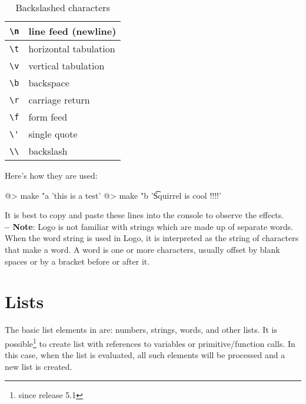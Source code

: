 \begin{table}[ht]
\begin{center}
\begin{tabular}{|c|l|}
\hline
\verb+\n+\index{\verb+\n+} & line feed (newline)\\
\hline
\verb+\t+\index{\verb+\t+} & horizontal tabulation\\
\hline
\verb+\v+\index{\verb+\v+} & vertical tabulation\\
\hline
\verb+\b+\index{\verb+\b+} & backspace\\
\hline
\verb+\r+\index{\verb+\r+} & carriage return\\
\hline
\verb+\f+\index{\verb+\f+} & form feed\\
\hline
\verb+\'+\index{\verb+\'+} & single quote\\
\hline
\verb+\\+\index{\verb+\\+} & backslash\\
\hline
\end{tabular}
\end{center}
\caption{Backslashed characters}
\end{table}
 
Here's how they are used:

\begin{verbatimtab}
@> make "a 'this is a test\n'
@> make "b '\t Squirrel is cool !!!!\n'
\end{verbatimtab}

It is best to copy and paste these lines into the console to observe the effects.\\

{\bf -- Note}:  Logo is not familiar with strings which are made up of separate words.  When the word string is used in Logo, it is interpreted as the string of characters that make a word.  A word is one or more characters, usually offset by blank spaces or by a bracket before or after it.
 
\section{Lists} 

The basic list elements in \squirrel are: numbers, strings, words, and other lists. It is possible\footnote{since release 5.1} to create list with references to variables or primitive/function calls. In this case, when the list is evaluated, all such elements will be processed and a new list is created.\\

